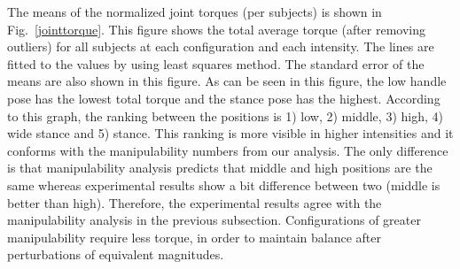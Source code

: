 The means of the normalized joint torques (per subjects) is shown in
Fig.~\ref{jointtorque}.  This figure shows the total average torque (after
removing outliers) for all subjects at each configuration and each intensity.
The lines are fitted to the values by using least squares method.  The
standard error of the means are also shown in this figure.  As can be seen in
this figure, the low handle pose has the lowest total torque and the stance
pose has the highest.  According to this graph, the ranking between the
positions is 1) low, 2) middle, 3) high, 4) wide stance and 5) stance.  This
ranking is more visible in higher intensities and it conforms with the
manipulability numbers from our analysis.  The only difference is that
manipulability analysis predicts that middle and high positions are the same
whereas experimental results show a bit difference between two (middle is
better than high).  Therefore, the experimental results agree with the
manipulability analysis in the previous subsection.  Configurations of greater
manipulability require less torque, in order to maintain balance after
perturbations of equivalent magnitudes.
